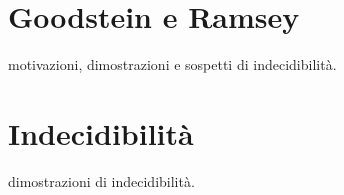 		
	\section{Goodstein e Ramsey}
		motivazioni, dimostrazioni e sospetti di indecidibilità.
		
	\section{Indecidibilità}
		dimostrazioni di indecidibilità.
		
